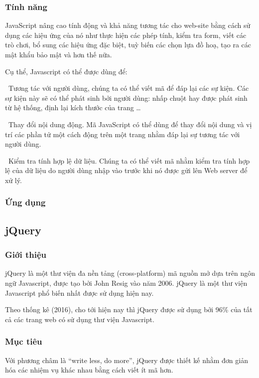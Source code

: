 \documentclass[12pt,a4paper,oneside]{article}
\begin{document}
\subsubsection{Tính năng}
JavaScript nâng cao tính động và khả năng tương tác cho web-site bằng cách sử dụng các hiệu ứng của nó như thực hiện các phép tính, kiểm tra form, viết các trò chơi, bổ sung các hiệu ứng đặc biệt, tuỳ biến các chọn lựa đồ hoạ, tạo ra các mật khẩu bảo mật và hơn thế nữa.

Cụ thể, Javascript có thể được dùng để:
 
\indent \indent \textbullet \ Tương tác với người dùng, chúng ta có thể viết mã để đáp lại các sự kiện. Các sự kiện này sẽ có thể phát sinh bởi người dùng: nhấp chuột hay được phát sinh từ hệ thống, định lại kích thước của trang …

\indent \indent \textbullet \ Thay đổi nội dung động. Mã JavaScript có thể dùng để thay đổi nội dung và vị trí các phần tử một cách động trên một trang nhằm đáp lại sự tương tác với người dùng.

\indent \indent \textbullet \ Kiểm tra tính hợp lệ dữ liệu. Chúng ta có thể viết mã nhằm kiểm tra tính hợp lệ của dữ liệu do người dùng nhập vào trước khi nó được gửi lên Web server để xử lý.

\subsubsection{Ứng dụng}


\subsection{jQuery}
\subsubsection{Giới thiệu}
jQuery\cite{jqueryintro1}\cite{jqueryintro2} là một thư viện đa nền tảng (cross-platform) mã nguồn mở dựa trên ngôn ngữ Javascript, được tạo bởi John Resig vào năm 2006. jQuery là một thư viện Javascript phổ biến nhất được sử dụng hiện nay.

Theo thống kê (2016)\cite{jqueryusage}, cho tới hiện nay thì jQuery được sử dụng bởi 96\% của tất cả các trang web có sử dụng thư viện Javascript.

\subsubsection{Mục tiêu}
Với phương châm là “write less, do more”, jQuery được thiết kế nhằm đơn giản hóa các nhiệm vụ khác nhau bằng cách viết ít mã hơn. 
\end{document}
